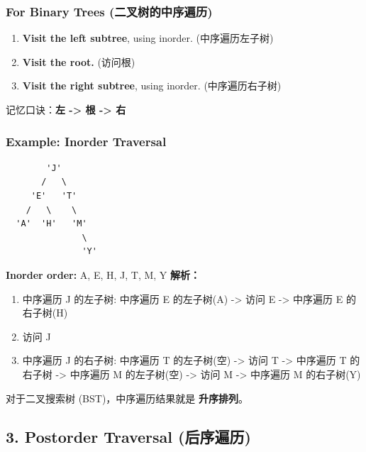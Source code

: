 \documentclass[10pt,a4paper,openany]{ctexbook}
\theoremstyle{definition}
\theoremstyle{remark}
\renewenvironment{quote}
  {\list{}{\leftmargin=1em\rightmargin=0pt\topsep=0.5pt\partopsep=0pt}\item[]}
  {\endlist}
\begin{document}
\subsubsection{For Binary Trees (二叉树的中序遍历)}

\begin{enumerate}
\item \textbf{Visit the left subtree}, using inorder. (中序遍历左子树)
\item \textbf{Visit the root.} (访问根)
\item \textbf{Visit the right subtree}, using inorder. (中序遍历右子树)

\end{enumerate}

\begin{quote}
记忆口诀：\textbf{左 -> 根 -> 右}

\end{quote}

\subsubsection{Example: Inorder Traversal}

{\footnotesize\begin{verbatim}
        'J'
       /   \
     'E'   'T'
    /   \    \
  'A'  'H'   'M'
               \
               'Y'
\end{verbatim}}

\textbf{Inorder order:} A, E, H, J, T, M, Y
\textbf{解析：}
\begin{enumerate}
\item 中序遍历 J 的左子树: 中序遍历 E 的左子树(A) -> 访问 E -> 中序遍历 E 的右子树(H)
\item 访问 J
\item 中序遍历 J 的右子树: 中序遍历 T 的左子树(空) -> 访问 T -> 中序遍历 T 的右子树 -> 中序遍历 M 的左子树(空) -> 访问 M -> 中序遍历 M 的右子树(Y)

\end{enumerate}

\begin{quote}
对于二叉搜索树 (BST)，中序遍历结果就是 \textbf{升序排列}。

\end{quote}
\vspace{-2pt}

\subsection{3. Postorder Traversal (后序遍历)}
\end{document}
